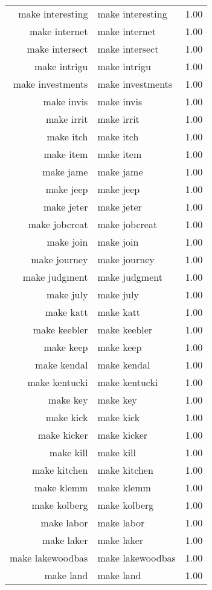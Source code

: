 \begin{table}[ht]
\begin{tabular}{rlr}
  make interesting & make interesting & 1.00 \\ 
  make internet & make internet & 1.00 \\ 
  make intersect & make intersect & 1.00 \\ 
  make intrigu & make intrigu & 1.00 \\ 
  make investments & make investments & 1.00 \\ 
  make invis & make invis & 1.00 \\ 
  make irrit & make irrit & 1.00 \\ 
  make itch & make itch & 1.00 \\ 
  make item & make item & 1.00 \\ 
  make jame & make jame & 1.00 \\ 
  make jeep & make jeep & 1.00 \\ 
  make jeter & make jeter & 1.00 \\ 
  make jobcreat & make jobcreat & 1.00 \\ 
  make join & make join & 1.00 \\ 
  make journey & make journey & 1.00 \\ 
  make judgment & make judgment & 1.00 \\ 
  make july & make july & 1.00 \\ 
  make katt & make katt & 1.00 \\ 
  make keebler & make keebler & 1.00 \\ 
  make keep & make keep & 1.00 \\ 
  make kendal & make kendal & 1.00 \\ 
  make kentucki & make kentucki & 1.00 \\ 
  make key & make key & 1.00 \\ 
  make kick & make kick & 1.00 \\ 
  make kicker & make kicker & 1.00 \\ 
  make kill & make kill & 1.00 \\ 
  make kitchen & make kitchen & 1.00 \\ 
  make klemm & make klemm & 1.00 \\ 
  make kolberg & make kolberg & 1.00 \\ 
  make labor & make labor & 1.00 \\ 
  make laker & make laker & 1.00 \\ 
  make lakewoodbas & make lakewoodbas & 1.00 \\ 
  make land & make land & 1.00 \\ 

\end{tabular}
\end{table}
